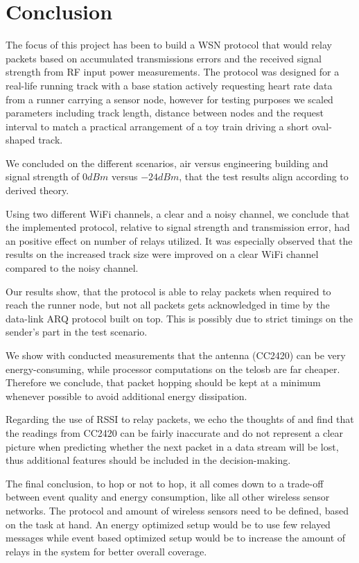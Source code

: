 \section{Conclusion}\label{ch:conclusion}

The focus of this project has been to build a WSN protocol that would relay packets based on accumulated transmissions errors and the received signal strength from RF input power measurements. The protocol was designed for a real-life running track with a base station actively requesting heart rate data from a runner carrying a sensor node, however for testing purposes we scaled parameters including track length, distance between nodes and the request interval to match a practical arrangement of a toy train driving a short oval-shaped track.

\noindent We concluded on the different scenarios, air versus engineering building and signal strength of $0 dBm$ versus $-24 dBm$, that the test results align according to derived theory.

\noindent Using two different WiFi channels, a clear and a noisy channel, we conclude that the implemented protocol, relative to signal strength and transmission error, had an positive effect on number of relays utilized. It was especially observed that the results on the increased track size were improved on a clear WiFi channel compared to the noisy channel.

\noindent Our results show, that the protocol is able to relay packets when required to reach the runner node, but not all packets gets acknowledged in time by the data-link ARQ protocol built on top. This is possibly due to strict timings on the sender's part in the test scenario.

\noindent We show with conducted measurements that the antenna (CC2420) can be very energy-consuming, while processor computations on the telosb are far cheaper. Therefore we conclude, that packet hopping should be kept at a minimum whenever possible to avoid additional energy dissipation.

\noindent Regarding the use of RSSI to relay packets, we echo the thoughts of \cite{Heurtefeux2012} and find that the readings from CC2420 can be fairly inaccurate and do not represent a clear picture when predicting whether the next packet in a data stream will be lost, thus additional features should be included in the decision-making.

\noindent The final conclusion, to hop or not to hop, it all comes down to a trade-off between event quality and energy consumption, like all other wireless sensor networks. The protocol and amount of wireless sensors need to be defined, based on the task at hand. An energy optimized setup would be to use few relayed messages while event based optimized setup would be to increase the amount of relays in the system for better overall coverage.